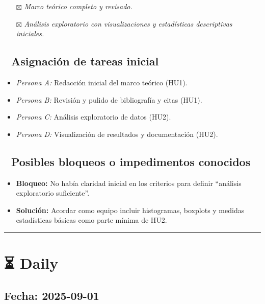 \documentclass[
  11pt,
]{article}
\providecommand{\tightlist}{%
  \setlength{\itemsep}{0pt}\setlength{\parskip}{0pt}}
\begin{document}
\begin{itemize}
\tightlist
\item[$\boxtimes$]
  \emph{Marco teórico completo y revisado.}
\item[$\boxtimes$]
  \emph{Análisis exploratorio con visualizaciones y estadísticas
  descriptivas iniciales.}
\end{itemize}

\subsection{📌 Asignación de tareas
inicial}\label{asignaciuxf3n-de-tareas-inicial}

\begin{itemize}
\tightlist
\item
  \emph{Persona A:} Redacción inicial del marco teórico (HU1).
\item
  \emph{Persona B:} Revisión y pulido de bibliografía y citas (HU1).
\item
  \emph{Persona C:} Análisis exploratorio de datos (HU2).
\item
  \emph{Persona D:} Visualización de resultados y documentación (HU2).
\end{itemize}

\subsection{🚫 Posibles bloqueos o impedimentos
conocidos}\label{posibles-bloqueos-o-impedimentos-conocidos}

\begin{itemize}
\tightlist
\item
  \textbf{Bloqueo:} No había claridad inicial en los criterios para
  definir ``análisis exploratorio suficiente''.
\item
  \textbf{Solución:} Acordar como equipo incluir histogramas, boxplots y
  medidas estadísticas básicas como parte mínima de HU2.
\end{itemize}

\begin{center}\rule{0.5\linewidth}{0.5pt}\end{center}

\section{⏳ Daily}\label{daily}

\subsection{Fecha: 2025-09-01}\label{fecha-2025-09-01}
\end{document}
